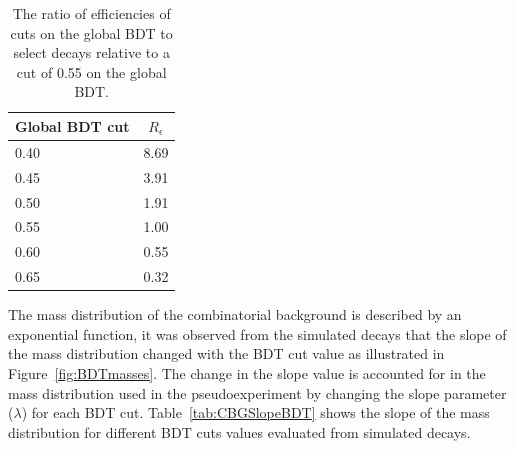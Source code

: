 {\begin{table}[htbp]
\begin{center}
\begin{tabular}{lc}
\hline
Global BDT cut & $R_{\epsilon}$ \\ \hline 
0.40 & 8.69 \\
0.45 & 3.91 \\
0.50 & 1.91 \\
0.55 & 1.00 \\
0.60 & 0.55 \\
0.65 & 0.32 \\ \hline
\end{tabular}
\vspace{0.7cm}

\caption{The ratio of efficiencies of cuts on the global BDT to select \bbbarmumux decays relative to a cut of 0.55 on the global BDT. }
\label{tab:EfficiencyRatioCombBG}
\end{center}
\vspace{-1.0cm}
\end{table}


The mass distribution of the combinatorial background is described by an exponential function, it was observed from the simulated \bbbarmumux decays that the slope of the mass distribution changed with the BDT cut value as illustrated in Figure~\ref{fig:BDTmasses}. The change in the slope value is accounted for in the mass distribution used in the pseudoexperiment by changing the slope parameter ($\lambda$) for each BDT cut. Table~\ref{tab:CBGSlopeBDT} shows the slope of the mass distribution for different BDT cuts values evaluated from \bbbarmumux simulated decays.

}
